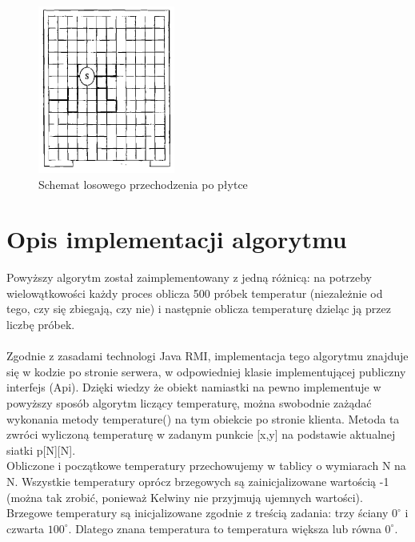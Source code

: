 \documentclass[11pt,a4paper]{article}
\begin{document}
\begin{figure}[H]
\begin{center}
\includegraphics[width=0.4\textwidth]{random_walk.png}
\caption{Schemat losowego przechodzenia po płytce}
\end{center}
\end{figure}

\section{Opis implementacji algorytmu}
Powyższy algorytm został zaimplementowany z jedną różnicą: na potrzeby wielowątkowości każdy proces oblicza 500 próbek temperatur (niezależnie od tego, czy się zbiegają, czy nie) i następnie oblicza temperaturę dzieląc ją przez liczbę próbek.\\
\\
Zgodnie z zasadami technologi Java RMI, implementacja tego algorytmu znajduje się w kodzie po stronie serwera, w odpowiedniej klasie implementującej publiczny interfejs (Api). Dzięki wiedzy że obiekt namiastki na pewno implementuje w powyższy sposób algorytm liczący temperaturę, można swobodnie zażądać wykonania metody temperature() na tym obiekcie po stronie klienta. Metoda ta zwróci wyliczoną temperaturę w zadanym punkcie [x,y] na podstawie aktualnej siatki p[N][N].
\\
Obliczone i początkowe temperatury przechowujemy w tablicy o wymiarach N na N. Wszystkie temperatury oprócz brzegowych są zainicjalizowane wartością -1 (można tak zrobić, ponieważ Kelwiny nie przyjmują ujemnych wartości). Brzegowe temperatury są inicjalizowane zgodnie z treścią zadania: trzy ściany $0^{\circ}$ i czwarta $100^{\circ}$. Dlatego znana temperatura to temperatura większa lub równa $0^{\circ}$.
\end{document}
